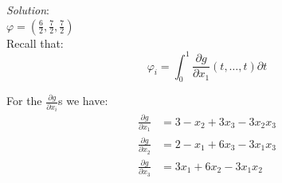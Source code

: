 \documentclass{article}
\begin{document}
\begin{enumerate}
\begin{enumerate}
  \textit{Solution}: \\

  $\varphi = (\frac{6}{2}, \frac{7}{2}, \frac{7}{2})$ \\

  Recall that:
  \[ \varphi_{i} = \int_{0}^{1} \frac{\partial g}{\partial x_{1}} (t, \dots, t) \partial t \]

  For the $\frac{\partial g}{\partial x_{i}}$s we have:
  \begin{align*}
  \frac{\partial g}{\partial x_{1}} &= 3      - x_{2}  + 3x_{3}      - 3x_{2}x_{3}  \\
  \frac{\partial g}{\partial x_{2}} &= 2      - x_{1}  + 6x_{3}      - 3x_{1}x_{3}  \\
  \frac{\partial g}{\partial x_{3}} &= 3x_{1} + 6x_{2} - 3x_{1}x_{2}
  \end{align*}


\end{enumerate}
\end{enumerate}
\end{document}
